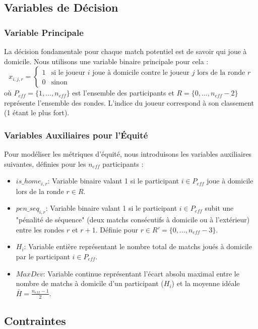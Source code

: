 \documentclass[11pt, a4paper]{article}
\begin{document}
\subsection{Variables de Décision}
\subsubsection{Variable Principale}
La décision fondamentale pour chaque match potentiel est de savoir qui joue à domicile. Nous utilisons une variable binaire principale pour cela :
\begin{equation}
    x_{i,j,r} =
    \begin{cases}
        1 & \text{si le joueur } i \text{ joue à domicile contre le joueur } j \text{ lors de la ronde } r \\
        0 & \text{sinon}
    \end{cases}
\end{equation}
où $P_{eff} = \{1, \dots, n_{eff}\}$ est l'ensemble des participants et $R = \{0, \dots, n_{eff}-2\}$ représente l'ensemble des rondes. L'indice du joueur correspond à son classement (1 étant le plus fort).

\subsubsection{Variables Auxiliaires pour l'Équité}
Pour modéliser les métriques d'équité, nous introduisons les variables auxiliaires suivantes, définies pour les $n_{eff}$ participants :
\begin{itemize}
    \item $is\_home_{i,r}$: Variable binaire valant 1 si le participant $i \in P_{eff}$ joue à domicile lors de la ronde $r \in R$.
    \item $pen\_seq_{i,r}$: Variable binaire valant 1 si le participant $i \in P_{eff}$ subit une "pénalité de séquence" (deux matchs consécutifs à domicile ou à l'extérieur) entre les rondes $r$ et $r+1$. Définie pour $r \in R' = \{0, \dots, n_{eff}-3\}$.
    \item $H_i$: Variable entière représentant le nombre total de matchs joués à domicile par le participant $i \in P_{eff}$.
    \item $MaxDev$: Variable continue représentant l'écart absolu maximal entre le nombre de matchs à domicile d'un participant ($H_i$) et la moyenne idéale $\bar{H} = \frac{n_{eff}-1}{2}$.
\end{itemize}

\subsection{Contraintes}
\end{document}
